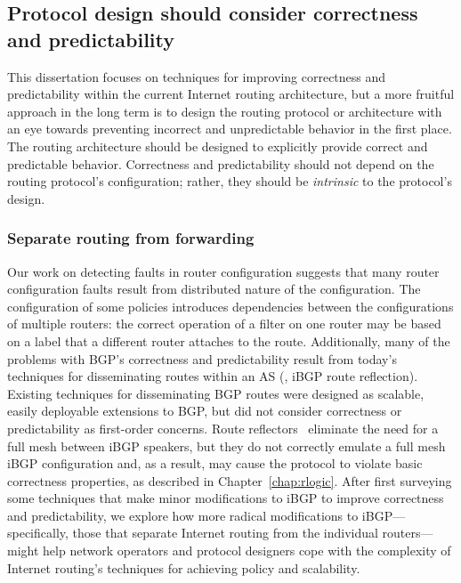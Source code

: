 \subsection{Protocol design should consider correctness and
predictability}\label{sec:rcp} 


This dissertation focuses on techniques for improving correctness and
predictability within the current Internet routing architecture, but a
more fruitful approach in the long term is to design the routing
protocol or architecture with an eye towards
preventing incorrect and unpredictable behavior in the first place.
The routing architecture should be designed to explicitly
provide correct and predictable behavior. Correctness and predictability
should not depend on the routing protocol's configuration; rather, they
should be {\em intrinsic} to the protocol's design.


\subsubsection{Separate routing from forwarding}


Our work on detecting faults in router configuration suggests that many
router configuration faults result from distributed nature of the
configuration.  The configuration of some policies introduces
dependencies between the configurations of multiple routers: the correct
operation of a filter on one router may be based on a label that a
different router attaches to the route.  
%
Additionally, many of the problems with BGP's correctness and
predictability result from today's techniques for disseminating routes
within an AS (\ie, iBGP route reflection).  Existing techniques for
disseminating BGP routes were designed as scalable, easily deployable
extensions to BGP, but did not consider correctness or predictability as
first-order concerns.  Route reflectors~\cite{rfc2796} eliminate the
need for a full mesh between iBGP speakers, but they do not correctly
emulate a full mesh iBGP configuration and, as a result, may cause the
protocol to violate basic correctness properties, as described in
Chapter~\ref{chap:rlogic}.  
After first surveying some techniques that make minor modifications to
iBGP to improve correctness and predictability, we explore how more
radical modifications to iBGP---specifically, those that separate Internet 
routing from the individual routers---might help network operators and
protocol designers cope with the complexity of Internet routing's
techniques for achieving policy and scalability.

